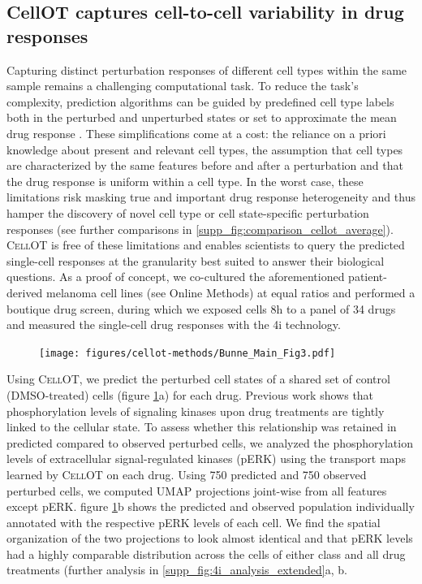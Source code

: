 \subsection{CellOT captures cell-to-cell variability in drug responses}
Capturing distinct perturbation responses of different cell types within the same sample remains a challenging computational task. To reduce the task's complexity, prediction algorithms can be guided by predefined cell type labels both in the perturbed and unperturbed states \cite{chen2020dissecting} or set to approximate the mean drug response \cite{lotfollahi2019scgen}.  These simplifications come at a cost: the reliance on a priori knowledge about present and relevant cell types, the assumption that cell types are characterized by the same features before and after a perturbation and that the drug response is uniform within a cell type.
In the worst case, these limitations risk masking true and important drug response heterogeneity  and thus hamper the discovery of novel cell type or cell state-specific perturbation responses (see further comparisons in \ref{supp_fig:comparison_cellot_average}).
\textsc{CellOT} is free of these limitations and enables scientists to query the predicted single-cell responses at the granularity best suited to answer their biological questions.
As a proof of concept, we co-cultured the aforementioned patient-derived melanoma cell lines (see Online Methods) at equal ratios and performed a boutique drug screen, during which we exposed cells 8h to a panel of 34 drugs and measured the single-cell drug responses with the 4i technology. 


\begin{figure}
  \begin{center}
    \texttt{[image: figures/cellot-methods/Bunne\_Main\_Fig3.pdf]}
  \end{center}
  \caption{}\label{fig:cellot-main-4i-analysis}
\end{figure}

Using \textsc{CellOT}, 
we predict the perturbed cell states of a shared set of control (DMSO-treated) cells (figure \ref{fig:cellot-main-4i-analysis}a) for each drug.
Previous work \cite{kramer2019cellular} shows that phosphorylation levels of signaling kinases upon drug treatments are tightly linked to the cellular state. 
To assess whether this relationship was retained in predicted compared to observed perturbed cells, we analyzed the phosphorylation levels of extracellular signal-regulated kinases (pERK) using the transport maps learned by \textsc{CellOT} on each drug.
Using 750 predicted and 750 observed perturbed cells, we computed UMAP projections joint-wise from all features except pERK.
figure \ref{fig:cellot-main-4i-analysis}b shows the predicted and observed population individually annotated with the respective pERK levels of each cell.
We find the spatial organization of the two projections to look almost identical and that pERK levels had a highly comparable distribution across the cells of either class and all drug treatments (further analysis in \ref{supp_fig:4i_analysis_extended}a, b.

